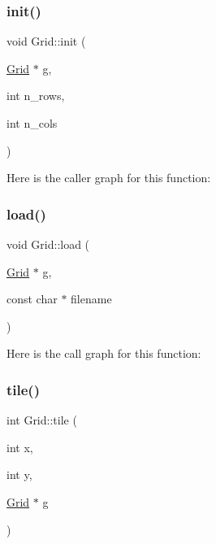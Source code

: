 \subsubsection{\texorpdfstring{init()}{init()}}
{\footnotesize\ttfamily void Grid\+::init (\begin{DoxyParamCaption}\item[{\mbox{\hyperlink{struct_grid_1_1_grid}{Grid}} $\ast$}]{g,  }\item[{int}]{n\+\_\+rows,  }\item[{int}]{n\+\_\+cols }\end{DoxyParamCaption})}

Here is the caller graph for this function\+:
\mbox{\label{namespace_grid_a3c9db382b0e0989888ec78831164c4be}} 
\subsubsection{\texorpdfstring{load()}{load()}}
{\footnotesize\ttfamily void Grid\+::load (\begin{DoxyParamCaption}\item[{\mbox{\hyperlink{struct_grid_1_1_grid}{Grid}} $\ast$}]{g,  }\item[{const char $\ast$}]{filename }\end{DoxyParamCaption})}

Here is the call graph for this function\+:
\mbox{\label{namespace_grid_ac334e1bf10e373e75d6bb9777d400712}} 
\subsubsection{\texorpdfstring{tile()}{tile()}\hspace{0.1cm}{\footnotesize\ttfamily [1/3]}}
{\footnotesize\ttfamily int Grid\+::tile (\begin{DoxyParamCaption}\item[{int}]{x,  }\item[{int}]{y,  }\item[{\mbox{\hyperlink{struct_grid_1_1_grid}{Grid}} $\ast$}]{g }\end{DoxyParamCaption})\hspace{0.3cm}{\ttfamily [inline]}}

\mbox{\label{namespace_grid_ac13cc066a37157453105c616d466a6d5}} 
